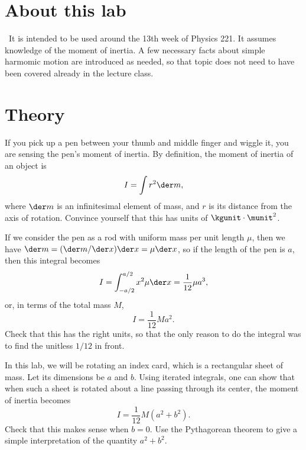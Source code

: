 \addtocounter{chapter}{-1}
\renewcommand\thechapter{c1.13a}
\label{lab:covid-moi}

\section*{About this lab}

\covid\ 
It is intended to be used around the 13th week of Physics 221.
It assumes knowledge of the moment of inertia. A few necessary facts about simple harmomic
motion are introduced as needed, so that topic does not need to have been covered already
in the lecture class.

\section*{Theory}
If you pick up a pen between your thumb and middle finger and wiggle it,
you are sensing the pen's moment of inertia. By definition, the moment of
inertia of an object is
\begin{equation*}
  I = \int r^2 \der m,
\end{equation*}
where $\der m$ is an infinitesimal element of mass, and $r$ is its distance
from the axis of rotation. Convince yourself that this has units of $\kgunit\cdot\munit^2$.

If we consider the pen as a rod with uniform mass per unit
length $\mu$, then we have $\der m=(\der m/\der x)\der x=\mu \der x$, so if the length of the pen is $a$, then this
integral becomes
\begin{equation*}
  I = \int_{-a/2}^{a/2} x^2 \mu \der x = \frac{1}{12}\mu a^3,
\end{equation*}
or, in terms of the total mass $M$,
\begin{equation*}
  I = \frac{1}{12}Ma^2.
\end{equation*}
Check that this has the right units, so that the only reason to do the integral was to find the unitless $1/12$ in front.

In this lab, we will be rotating an index card, which is a rectangular sheet of mass. Let its dimensions be $a$ and $b$.
Using iterated integrals, one can show that when such a sheet is rotated about a line passing through its center, the
moment of inertia becomes
\begin{equation*}
  I = \frac{1}{12}M\left(a^2+b^2\right).
\end{equation*}
Check that this makes sense when $b=0$. Use the Pythagorean theorem to give a simple interpretation
of the quantity $a^2+b^2$.

